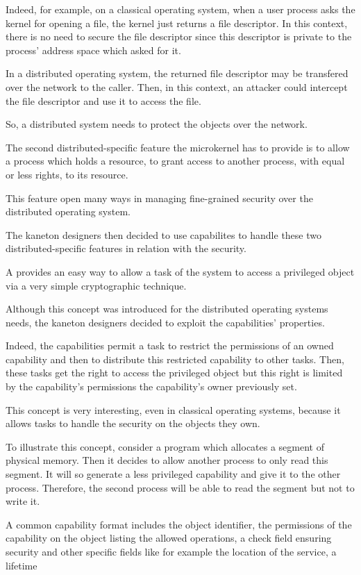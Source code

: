 \begin{multicols}{2}
Indeed, for example, on a classical operating system, when a user process
asks the kernel for opening a file, the kernel just returns a file descriptor.
In this context, there is no need to secure the file descriptor since
this descriptor is private to the process' address space which asked for it.

In a distributed operating system, the returned file descriptor may
be transfered over the network to the caller. Then, in this context,
an attacker could intercept the file descriptor and use it to access
the file.

So, a distributed system needs to protect the objects over the network.

The second distributed-specific feature the microkernel has to provide
is to allow a process which holds a resource, to grant access to another
process, with equal or less rights, to its resource.

This feature open many ways in managing fine-grained security over
the distributed operating system.

The kaneton designers then decided to use capabilites to handle these
two distributed-specific features in relation with the security.

A  provides an easy way to allow a task of the
system to access a privileged object via a very simple cryptographic
technique.

Although this concept was introduced for the distributed operating systems
needs, the kaneton designers decided to exploit the capabilities' properties.

Indeed, the capabilities permit a task to restrict the permissions
of an owned capability and then to distribute this restricted capability
to other tasks. Then, these tasks get the right to access the privileged
object but this right is limited by the capability's permissions the
capability's owner previously set.

This concept is very interesting, even in classical operating systems,
because it allows tasks to handle the security on the objects they own.

To illustrate this concept, consider a program which allocates a segment of
physical memory. Then it decides to allow another process to only read
this segment. It will so generate a less privileged capability and give
it to the other process. Therefore, the second process will be able to read
the segment but not to write it.

A common capability format includes the object identifier, the permissions
of the capability on the object listing the allowed operations, a check field
ensuring security and other specific fields like for example the location
of the service, a lifetime \etc{}


\end{multicols}
